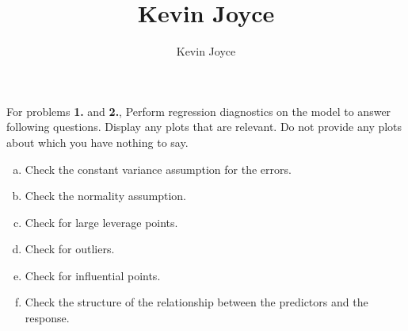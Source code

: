\documentclass{homework}
\title{Kevin Joyce}
\author{Kevin Joyce}
\begin{document}
 
\newcommand{\figref}[1]{\figurename~\ref{#1}}
\renewcommand{\bar}{\overline}
\renewcommand{\hat}{\widehat}
\renewcommand{\SS}{\mathcal S}
\newcommand{\HH}{\mathscr H}
\newcommand{\mom}{\widetilde}
\newcommand{\mle}{\widehat \Uptheta}
\newcommand{\eps}{\varepsilon}
\newcommand{\todist}{\stackrel{D}\longrightarrow}
\newcommand{\toprob}{\stackrel{p}\longrightarrow}
\newcommand{\TTheta}{\overline{\underline \Theta} }
\newcommand{\del}{\partial}
\newcommand{\approxsim}{\overset{\cdotp}{\underset{\cdotp}{\sim}}}
\newcommand{\RSS}{\ensuremath{\mathrm{RSS}}}
\newcommand{\MSE}{\ensuremath{\mathrm{MSE}}}
\newcommand{\SE}{\ensuremath{\mathrm{SE}}}
\newcommand{\TSS}{\ensuremath{\mathrm{TSS}}}
\newcommand{\SSReg}{\ensuremath{\mathrm{SSReg}}}

For problems \textbf{1.} and \textbf{2.}, Perform regression diagnostics on the model to answer following questions.  Display any plots that are relevant.  Do not provide any plots about which you have nothing to say.

\begin{enumerate}[(a)]
  \item Check the constant variance assumption for the errors.
  \item Check the normality assumption.
  \item Check for large leverage points.
  \item Check for outliers.
  \item Check for influential points.
  \item Check the structure of the relationship between the predictors and the response.
\end{enumerate}


\end{document}
